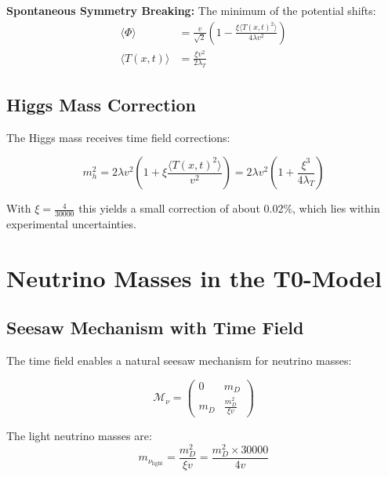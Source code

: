 \documentclass[12pt,a4paper]{report}
\newcommand{\Tfield}{T(x,t)}  %
\newcommand{\xipar}{\xi}      %
\begin{document}
	\textbf{Spontaneous Symmetry Breaking:}
	The minimum of the potential shifts:
	\begin{align}
		\langle \Phi \rangle &= \frac{v}{\sqrt{2}} \left(1 - \frac{\xipar \langle \Tfield^2 \rangle}{4\lambda v^2}\right) \\
		\langle \Tfield \rangle &= \frac{\xipar v^2}{2\lambda_T}
	\end{align}
	
	\subsection{Higgs Mass Correction}\label{subsec:higgs_mass_correction}
	
	The Higgs mass receives time field corrections:
	
	\begin{equation}\label{eq:higgs_mass_correction}
		m_h^2 = 2\lambda v^2 \left(1 + \xipar \frac{\langle \Tfield^2 \rangle}{v^2}\right) = 2\lambda v^2 \left(1 + \frac{\xipar^3}{4\lambda_T}\right)
	\end{equation}
	
	With $\xipar = \frac{4}{30000}$ this yields a small correction of about 0.02\%, which lies within experimental uncertainties.
	
	\section{Neutrino Masses in the T0-Model}\label{sec:neutrino_masses}
	
	\subsection{Seesaw Mechanism with Time Field}\label{subsec:seesaw_timefield}
	
	The time field enables a natural seesaw mechanism for neutrino masses:
	
	\begin{equation}\label{eq:neutrino_mass_matrix}
		\mathcal{M}_\nu = \begin{pmatrix}
			0 & m_D \\
			m_D & \frac{m_D^2}{\xipar v}
		\end{pmatrix}
	\end{equation}
	
	The light neutrino masses are:
	\begin{equation}
		m_{\nu_\text{light}} = \frac{m_D^2}{\xipar v} = \frac{m_D^2 \times 30000}{4v}
	\end{equation}
	
\end{document}
